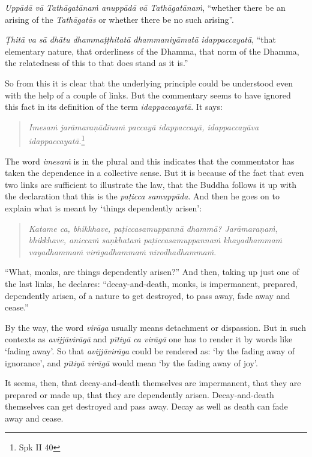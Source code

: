 \emph{Uppādā vā Tathāgatānaṁ anuppādā vā Tathāgatānaṁ}, ``whether there be an arising of the \emph{Tathāgatās} or whether there be no such arising''.

\emph{Ṭhitā va sā dhātu dhammaṭṭhitatā dhammaniyāmatā idappaccayatā}, ``that elementary nature, that orderliness of the Dhamma, that norm of the Dhamma, the relatedness of this to that does stand as it is.''

So from this it is clear that the underlying principle could be understood even with the help of a couple of links. But the commentary seems to have ignored this fact in its definition of the term \emph{idappaccayatā}. It says:

\begin{quote}
\emph{Imesaṁ jarāmaraṇādīnaṁ paccayā idappaccayā, idappaccayāva idappaccayatā}.\footnote{Spk II 40}
\end{quote}

The word \emph{imesaṁ} is in the plural and this indicates that the commentator has taken the dependence in a collective sense. But it is because of the fact that even two links are sufficient to illustrate the law, that the Buddha follows it up with the declaration that this is the \emph{paṭicca samuppāda}. And then he goes on to explain what is meant by `things dependently arisen':

\begin{quote}
\emph{Katame ca, bhikkhave, paṭiccasamuppannā dhammā? Jarāmaraṇaṁ, bhikkhave, aniccaṁ saṇkhataṁ paṭiccasamuppannaṁ khayadhammaṁ vayadhammaṁ virāgadhammaṁ nirodhadhammaṁ}.
\end{quote}

``What, monks, are things dependently arisen?'' And then, taking up just one of the last links, he declares: ``decay-and-death, monks, is impermanent, prepared, dependently arisen, of a nature to get destroyed, to pass away, fade away and cease.''

By the way, the word \emph{virāga} usually means detachment or dispassion. But in such contexts as \emph{avijjāvirāgā} and \emph{pītiyā ca virāgā} one has to render it by words like `fading away'. So that \emph{avijjāvirāga} could be rendered as: `by the fading away of ignorance', and \emph{pītiyā virāgā} would mean `by the fading away of joy'.

It seems, then, that decay-and-death themselves are impermanent, that they are prepared or made up, that they are dependently arisen. Decay-and-death themselves can get destroyed and pass away. Decay as well as death can fade away and cease.

